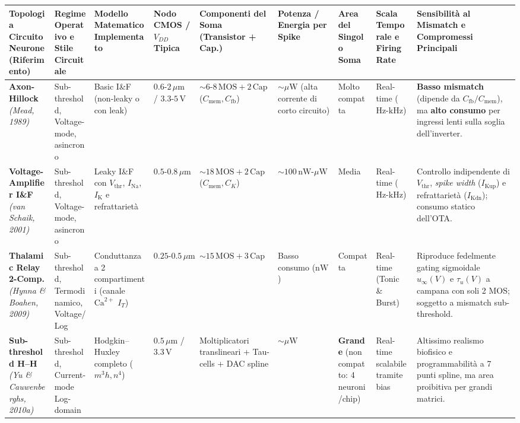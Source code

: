 \documentclass[11pt,a4paper]{article}
\begin{document}
\begin{center}
\scriptsize
\renewcommand{\arraystretch}{1.3}
\begin{tabularx}{\textwidth}{|>{\raggedright\arraybackslash}X|>{\raggedright\arraybackslash}X|>{\raggedright\arraybackslash}X|>{\raggedright\arraybackslash}X|>{\raggedright\arraybackslash}X|>{\raggedright\arraybackslash}X|>{\raggedright\arraybackslash}X|>{\raggedright\arraybackslash}X|>{\raggedright\arraybackslash}X|}
\hline
\textbf{Topologia Circuito Neurone (Riferimento)} & \textbf{Regime Operativo e Stile Circuitale} & \textbf{Modello Matematico Implementato} & \textbf{Nodo CMOS / $V_{DD}$ Tipica} & \textbf{Componenti del Soma (Transistor + Cap.)} & \textbf{Potenza / Energia per Spike} & \textbf{Area del Singolo Soma} & \textbf{Scala Temporale e Firing Rate} & \textbf{Sensibilità al Mismatch e Compromessi Principali} \\ \hline \hline
\textbf{Axon-Hillock} \textit{(Mead, 1989)} & Sub-threshold, Voltage-mode, asincrono & Basic I\&F (non-leaky o con leak) & $0.6\text{-}2\,\mu\text{m}$ / $3.3\text{-}5\,\text{V}$ & $\sim 6\text{-}8\,\text{MOS} + 2\,\text{Cap}$ ($C_{\text{mem}}, C_{\text{fb}}$) & $\sim \mu\text{W}$ (alta corrente di corto circuito) & Molto compatta & Real-time ($\text{Hz}\text{-}\text{kHz}$) & \textbf{Basso mismatch} (dipende da $C_{\text{fb}}/C_{\text{mem}}$), ma \textbf{alto consumo} per ingressi lenti sulla soglia dell'inverter. \\ \hline
\textbf{Voltage-Amplifier I\&F} \textit{(van Schaik, 2001)} & Sub-threshold, Voltage-mode, asincrono & Leaky I\&F con $V_{\text{thr}}$, $I_{\text{Na}}$, $I_{\text{K}}$ e refrattarietà & $0.5\text{-}0.8\,\mu\text{m}$ & $\sim 18\,\text{MOS} + 2\,\text{Cap}$ ($C_{\text{mem}}, C_K$) & $\sim 100\,\text{nW}\text{-}\mu\text{W}$ & Media & Real-time ($\text{Hz}\text{-}\text{kHz}$) & Controllo indipendente di $V_{\text{thr}}$, \textit{spike width} ($I_{\text{Kup}}$) e refrattarietà ($I_{\text{Kdn}}$); consumo statico dell'OTA. \\ \hline
\textbf{Thalamic Relay 2-Comp.} \textit{(Hynna \& Boahen, 2009)} & Sub-threshold, Termodinamico, Voltage/Log & Conduttanza a 2 compartimenti (canale $\text{Ca}^{2+}$ $I_T$) & $0.25\text{-}0.5\,\mu\text{m}$ & $\sim 15\,\text{MOS} + 3\,\text{Cap}$ & Basso consumo ($\text{nW}$) & Compatta & Real-time (Tonic \& Burst) & Riproduce fedelmente gating sigmoidale $u_\infty(V)$ e $\tau_u(V)$ a campana con soli 2 MOS; soggetto a mismatch sub-threshold. \\ \hline
\textbf{Sub-threshold H--H} \textit{(Yu \& Cauwenberghs, 2010a)} & Sub-threshold, Current-mode Log-domain & Hodgkin--Huxley completo ($m^3 h, n^4$) & $0.5\,\mu\text{m}$ / $3.3\,\text{V}$ & Moltiplicatori translineari + Tau-cells + DAC spline & $\sim \mu\text{W}$ & \textbf{Grande} (non compatto: 4 neuroni/chip) & Real-time scalabile tramite bias & Altissimo realismo biofisico e programmabilità a 7 punti spline, ma area proibitiva per grandi matrici. \\ \hline

\end{tabularx}
\end{center}
\end{document}
